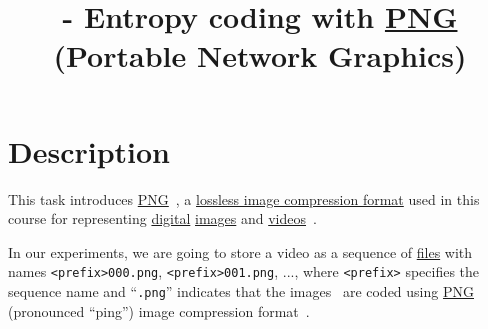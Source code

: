 


\title{\SM{} - Entropy coding with
  \href{https://vicente-gonzalez-ruiz.github.io/PNG/}{PNG} (Portable
  Network Graphics)}

\maketitle

\tableofcontents

\section{Description}

This task introduces
\href{https://vicente-gonzalez-ruiz.github.io/PNG/}{PNG}~\cite{vruiz__PNG},
a \href{https://en.wikipedia.org/wiki/Lossless_compression}{lossless
  image compression format} used in this course for representing
\href{https://en.wikipedia.org/wiki/Digital_data}{digital}
\href{https://en.wikipedia.org/wiki/Digital_image}{images} and
\href{https://en.wikipedia.org/wiki/Video}{videos}~\cite{vruiz__image_video}.

In our experiments, we are going to store a video as a sequence of
\href{https://en.wikipedia.org/wiki/Computer_file}{files} with names
{\tt <prefix>000.png}, {\tt <prefix>001.png}, ..., where {\tt <prefix>} specifies the
sequence name and ``{\tt .png}'' indicates that the images~\cite{vruiz__image_IO} are coded using
\href{https://en.wikipedia.org/wiki/Portable_Network_Graphics}{PNG}
(pronounced ``ping'') image compression
format~\cite{roelofs1999png,world2003portable}.


  
